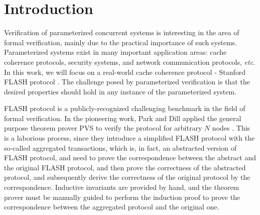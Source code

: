\documentclass{llncs}
\newcommand\JP[1]{\textcolor{magenta}{JP: #1}}
\newcommand{\bedt}[1]{{\color{blue}#1}}
\begin{document}
\section{Introduction}\label{sec:introduction}
Verification of parameterized concurrent systems is interesting in
the area of formal \bedt{verification}, mainly due to the practical importance
of such systems. Parameterized systems exist in many important
application areas: cache coherence protocols, security systems, and
network communication protocols, \emph{etc}. In this work, we will
focus on a real-world cache coherence protocol - Stanford FLASH protocol \cite{FLASHCache}. The challenge posed by
parameterized verification is that the desired properties should
hold in any instance of the parameterized system. %

FLASH protocol is a publicly-recognized challenging benchmark in the field of formal
 verification. In the pioneering work,
Park and Dill applied the general purpose theorem prover PVS \cite{cade92-pvs}
to   verify the protocol for arbitrary $N$ nodes \cite{Park1996a}. This is a laborious process, since they introduce a simplified  FLASH protocol with the so-called aggregated transactions, which
is, in fact,  an abstracted version of FLASH protocol, and  need to prove
the correspondence between the abstract and the original FLASH
protocol, and then prove the correctness of the abstracted protocol, and subsequently derive the correctness of  the
original protocol by the correspondence. %
Inductive invariants are provided by \bedt{hand}, and the theorem prover must be manually guided to perform the induction proof to prove the correspondence between the aggregated protocol  and the original one. %
\end{document}
